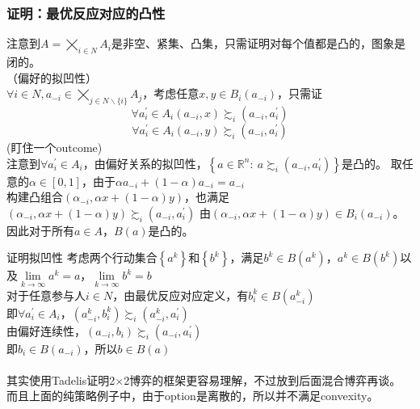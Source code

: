 \documentclass{beamer}
\begin{document}
\begin{frame}[label = convexity_of_best_response_correspondence]
	\frametitle{证明：最优反应对应的凸性}
	注意到$A=\bigtimes\limits_{i\in N} A_{i}$是非空、紧集、凸集，只需证明对每个值都是凸的，图象是闭的。\\
	（偏好的拟凹性）\\
	$\forall i\in N, a_{-i}\in\bigtimes\limits_{j\in N\backslash\{i\}} A_{j}$，考虑任意$x,y\in B_{i}\left(a_{-i}\right)$，只需证\\
	$$\forall a_{i}^{'}\in A_{i} \left(a_{-i},x\right)\succsim_{i} \left(a_{-i},a_{i}^{'}\right)$$
	$$\forall a_{i}^{'}\in A_{i} \left(a_{-i},y\right)\succsim_{i} \left(a_{-i},a_{i}^{'}\right)$$
	(盯住一个outcome)\\
	注意到$\forall a_{i}^{'}\in A_{i}$，由偏好关系的拟凹性，$ \left\lbrace a\in \mathbb{R}^{n}:\ a\succsim_{i} \left(a_{-i},a_{i}^{'}\right)\right\rbrace $是凸的。
	取任意的$\alpha\in \left[0,1\right]$，由于$\alpha a_{-i}+\left(1-\alpha\right)a_{-i}=a_{-i}$\\
	构建凸组合$\left(\alpha_{-i},\alpha x+\left(1-\alpha\right)y\right)$，也满足$\left(\alpha_{-i},\alpha x+\left(1-\alpha\right)y\right)\succsim_{i}\left(a_{-i},a_{i}^{'}\right)$
	由$\left(\alpha_{-i},\alpha x+\left(1-\alpha\right)y\right)\in B_{i}\left(a_{-i}\right)$。因此对于所有$a\in A$，$B\left(a\right)$是凸的。
\end{frame}
\begin{frame}{证明拟凹性}
	考虑两个行动集合$\left\lbrace a^{k}\right\rbrace$和$\left\lbrace b^{k}\right\rbrace$，满足$b^{k}\in B\left(a^{k}\right)$，$a^{k}\in B\left(b^{k}\right)$以及$\lim\limits_{k\to\infty}a^{k}=a$，$\lim\limits_{k\to\infty}b^{k}=b$\\
	对于任意参与人$i\in N$，由最优反应对应定义，有$b^{k}_{i}\in B\left(a^{k}_{-i}\right)$\\
	即$\forall a_{i}^{'}\in A_{i}$，$\left(a_{-i}^{k},b_{i}^{k}\right)\succsim_{i}\left(a_{-i}^{k},a_{i}^{'}\right)$\\
	由偏好连续性，$\left(a_{-i},b_{i}\right)\succsim_{i}\left(a_{-i},a_{i}^{'}\right)$\\
	即$b_{i}\in B\left(a_{-i}\right)$，所以$b\in B\left(a\right)$\\~\\
	其实使用Tadelis证明2$\times $2博弈的框架更容易理解，不过放到后面混合博弈再谈。\\
	而且上面的纯策略例子中，由于option是离散的，所以并不满足convexity。
\end{frame}
\end{document}
